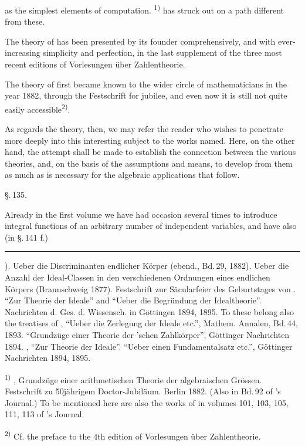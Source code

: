 
as the simplest elements of computation. \textsuperscript{1)} has struck out on a
path different from these.

The theory of  has been presented by its founder
comprehensively, and with ever-increasing simplicity and perfection, in the
last supplement of the three most recent editions of 
Vorlesungen \"uber Zahlentheorie.

The theory of  first became known to the wider circle
of mathematicians in the year 1882, through the Festschrift for
 jubilee, and even now it is still not quite easily
accessible\textsuperscript{2)}.

As regards the  theory, then, we may refer the reader
who wishes to penetrate more deeply into this interesting subject to the
works named. Here, on the other hand, the attempt shall be made to
establish the connection between the various theories, and, on the basis
of the  assumptions and means, to develop from them as
much as is necessary for the algebraic applications that follow.

\begin{center}
\S.\,135.

\end{center}

Already in the first volume we have had occasion several times to
introduce integral functions of an arbitrary number of independent
variables, and have also (in \S.\,141 f.)

\vspace{1em}\hrule\vspace{0.5em}

). Ueber die Discriminanten endlicher K\"orper (ebend.,
Bd.\,29, 1882). Ueber die Anzahl der Ideal-Classen in den verschiedenen
Ordnungen eines endlichen K\"orpers (Braunschweig 1877). Festschrift zur
S\"acularfeier des Geburtstages von . ``Zur Theorie der
Ideale'' and ``Ueber die Begr\"undung der Idealtheorie''. Nachrichten d.
Ges. d. Wissensch. in G\"ottingen 1894, 1895. To these belong also the
treatises of , ``Ueber die Zerlegung der Ideale
etc.'', Mathem. Annalen, Bd.\,44, 1893. ``Grundz\"uge einer Theorie der
'schen Zahlk\"orper'', G\"ottinger Nachrichten 1894.
, ``Zur Theorie der Ideale''. ``Ueber einen
Fundamentalsatz etc.'', G\"ottinger Nachrichten 1894, 1895.

\noindent\textsuperscript{1)} , Grundz\"uge einer
arithmetischen Theorie der algebraischen Gr\"ossen. Festschrift zu
 50j\"ahrigem Doctor-Jubil\"aum. Berlin 1882. (Also in
Bd.\,92 of 's Journal.) To be mentioned here are also the works of
 in volumes 101, 103, 105, 111, 113 of 's Journal.

\noindent\textsuperscript{2)} Cf. the preface to the 4th edition of
 Vorlesungen \"uber Zahlentheorie.
